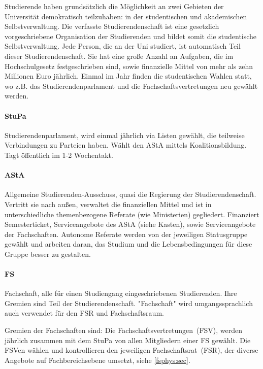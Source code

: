 \begin{multicols}{2}
Studierende haben grundsätzlich die Möglichkeit an zwei Gebieten der Universität demokratisch teilzuhaben: in der studentischen und akademischen Selbstverwaltung.
Die verfasste Studierendenschaft ist eine gesetzlich vorgeschriebene Organisation der Studierenden und bildet somit die studentische Selbstverwaltung. Jede Person, die an der Uni studiert, ist automatisch Teil dieser Studierendenschaft. Sie hat eine große Anzahl an Aufgaben, die im Hochschulgesetz festgeschrieben sind, sowie finanzielle Mittel von mehr als zehn Millionen Euro jährlich. 
Einmal im Jahr finden die studentischen Wahlen statt, wo z.B. das Studierendenparlament und die Fachschaftsvertretungen neu gewählt werden. 

\paragraph{StuPa}
Studierendenparlament, wird einmal jährlich via Listen gewählt, die teilweise Verbindungen zu Parteien haben. Wählt den AStA mittels Koalitionsbildung. Tagt öffentlich im 1-2 Wochentakt. 


\paragraph{AStA}
Allgemeine Studierenden-Ausschuss, quasi die Regierung der Studierendenschaft. Vertritt sie nach außen, verwaltet die finanziellen Mittel und ist in unterschiedliche themenbezogene Referate (wie Ministerien) gegliedert. Finanziert Semesterticket, Serviceangebote des AStA (siehe Kasten), sowie Serviceangebote der Fachschaften. Autonome Referate werden von der jeweiligen Statusgruppe gewählt und arbeiten daran, das Studium und die Lebensbedingungen für diese Gruppe besser zu gestalten.


\paragraph{FS}
Fachschaft, alle für einen Studiengang eingeschriebenen Studierenden. Ihre Gremien sind Teil der Studierendenschaft. "Fachschaft" wird umgangssprachlich auch verwendet für den FSR und Fachschaftsraum.

Gremien der Fachschaften sind: Die Fachschaftsvertretungen~(FSV), werden jährlich zusammen mit dem StuPa von allen Mitgliedern einer FS gewählt. Die FSVen wählen und kontrollieren den jeweiligen Fachschaftsrat~(FSR), der diverse Angebote auf Fachbereichsebene umsetzt, siehe \cref{fsphys:sec}.


\end{multicols}
